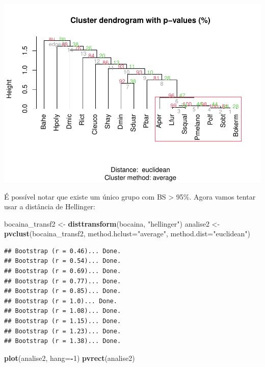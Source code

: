 \documentclass[
]{book}
\newenvironment{Shaded}{\begin{snugshade}}{\end{snugshade}}
\newcommand{\DataTypeTok}[1]{\textcolor[rgb]{0.13,0.29,0.53}{#1}}
\newcommand{\DecValTok}[1]{\textcolor[rgb]{0.00,0.00,0.81}{#1}}
\newcommand{\KeywordTok}[1]{\textcolor[rgb]{0.13,0.29,0.53}{\textbf{#1}}}
\newcommand{\NormalTok}[1]{#1}
\newcommand{\OperatorTok}[1]{\textcolor[rgb]{0.81,0.36,0.00}{\textbf{#1}}}
\newcommand{\StringTok}[1]{\textcolor[rgb]{0.31,0.60,0.02}{#1}}
\begin{document}
\includegraphics{livro_r_ecologia_files/figure-latex/unnamed-chunk-29-1.pdf}

É possível notar que existe um único grupo com BS \textgreater{} 95\%. Agora vamos tentar usar a distância de Hellinger:

\begin{Shaded}
\begin{Highlighting}[]
\NormalTok{bocaina_transf2 <-}\StringTok{ }\KeywordTok{disttransform}\NormalTok{(bocaina, }\StringTok{"hellinger"}\NormalTok{)}
\NormalTok{analise2 <-}\StringTok{ }\KeywordTok{pvclust}\NormalTok{(bocaina_transf2, }\DataTypeTok{method.hclust=}\StringTok{"average"}\NormalTok{, }\DataTypeTok{method.dist=}\StringTok{"euclidean"}\NormalTok{) }
\end{Highlighting}
\end{Shaded}

\begin{verbatim}
## Bootstrap (r = 0.46)... Done.
## Bootstrap (r = 0.54)... Done.
## Bootstrap (r = 0.69)... Done.
## Bootstrap (r = 0.77)... Done.
## Bootstrap (r = 0.85)... Done.
## Bootstrap (r = 1.0)... Done.
## Bootstrap (r = 1.08)... Done.
## Bootstrap (r = 1.15)... Done.
## Bootstrap (r = 1.23)... Done.
## Bootstrap (r = 1.38)... Done.
\end{verbatim}

\begin{Shaded}
\begin{Highlighting}[]
\KeywordTok{plot}\NormalTok{(analise2, }\DataTypeTok{hang=}\OperatorTok{-}\DecValTok{1}\NormalTok{)}
\KeywordTok{pvrect}\NormalTok{(analise2)}
\end{Highlighting}
\end{Shaded}
\end{document}
